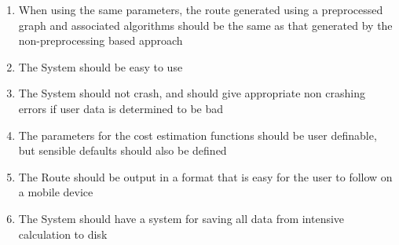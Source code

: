 \documentclass[11pt,twoside,a4paper]{article}
\begin{document}
\begin{enumerate}
\begin{enumerate}[label=\arabic{enumi}.\arabic*]
    \item When using the same parameters, the route generated using a preprocessed graph and associated algorithms should be the same as that generated by the non-preprocessing based approach
    \item The System should be easy to use
    \item \label{nocrashy} The System should not crash, and should give appropriate non crashing errors if user data is determined to be bad
    \item The parameters for the cost estimation functions should be user definable, but sensible defaults should also be defined
    \item \label{followpossible}The Route should be output in a format that is easy for the user to follow on a mobile device
    \item The System should have a system for saving all data from intensive calculation to disk
\end{enumerate}
\end{enumerate}
\newpage
\end{document}
